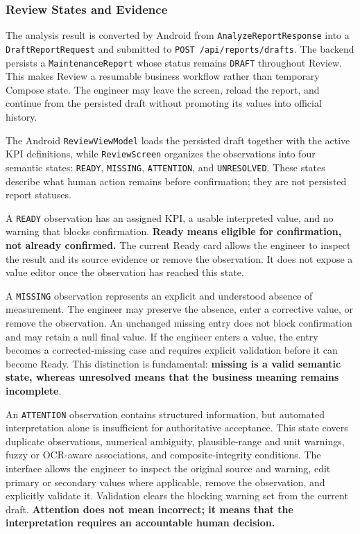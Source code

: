 \subsubsection{Review States and Evidence}

The analysis result is converted by Android from \texttt{AnalyzeReportResponse} into a \texttt{DraftReportRequest} and submitted to \texttt{POST /api/reports/drafts}. The backend persists a \texttt{MaintenanceReport} whose status remains \texttt{DRAFT} throughout Review. This makes Review a resumable business workflow rather than temporary Compose state. The engineer may leave the screen, reload the report, and continue from the persisted draft without promoting its values into official history.

The Android \texttt{ReviewViewModel} loads the persisted draft together with the active KPI definitions, while \texttt{ReviewScreen} organizes the observations into four semantic states: \texttt{READY}, \texttt{MISSING}, \texttt{ATTENTION}, and \texttt{UNRESOLVED}. These states describe what human action remains before confirmation; they are not persisted report statuses.

A \texttt{READY} observation has an assigned KPI, a usable interpreted value, and no warning that blocks confirmation. \textbf{Ready means eligible for confirmation, not already confirmed.} The current Ready card allows the engineer to inspect the result and its source evidence or remove the observation. It does not expose a value editor once the observation has reached this state.

A \texttt{MISSING} observation represents an explicit and understood absence of measurement. The engineer may preserve the absence, enter a corrective value, or remove the observation. An unchanged missing entry does not block confirmation and may retain a null final value. If the engineer enters a value, the entry becomes a corrected-missing case and requires explicit validation before it can become Ready. This distinction is fundamental: \textbf{missing is a valid semantic state, whereas unresolved means that the business meaning remains incomplete}.

An \texttt{ATTENTION} observation contains structured information, but automated interpretation alone is insufficient for authoritative acceptance. This state covers duplicate observations, numerical ambiguity, plausible-range and unit warnings, fuzzy or OCR-aware associations, and composite-integrity conditions. The interface allows the engineer to inspect the original source and warning, edit primary or secondary values where applicable, remove the observation, and explicitly validate it. Validation clears the blocking warning set from the current draft. \textbf{Attention does not mean incorrect; it means that the interpretation requires an accountable human decision.}

